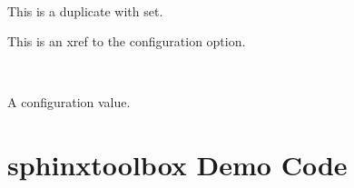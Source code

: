 \documentclass[letterpaper,10pt,english]{sphinxmanual}
\begin{document}
\vspace{5px}

\begin{fulllineitems}
~
\vspace{-45px}

\begin{DUlineblock}{0em}
\item[]  
\end{DUlineblock}

\vspace{-25px}

This is a duplicate with  set.

\end{fulllineitems}


This is an xref to the {\hyperref[\detokenize{confval:confval-github_repository}]{}} configuration option.


\vspace{5px}

\begin{fulllineitems}
\label{\detokenize{confval:confval-something}}~
\vspace{-25px}

A configuration value.

\end{fulllineitems}



\chapter{sphinx\sphinxhyphen{}toolbox Demo \sphinxhyphen{} Code}
\label{\detokenize{code-block:sphinx-toolbox-demo-code}}\label{\detokenize{code-block::doc}}
\begin{sphinxVerbatim}[commandchars=\\\{\}]
 
\end{sphinxVerbatim}

\begin{sphinxVerbatim}[commandchars=\\\{\}]
 
\end{sphinxVerbatim}
\end{document}
